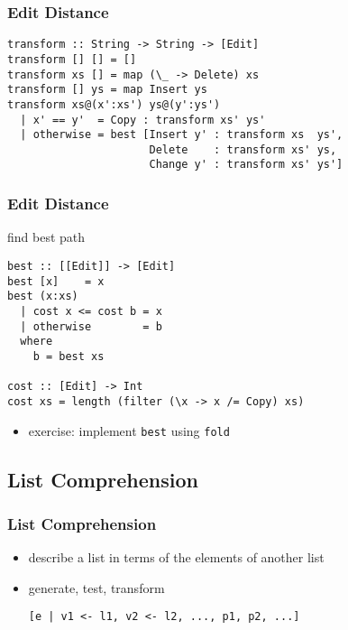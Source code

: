 \documentclass[dvipsnames]{beamer}
\theoremstyle{plain}
\begin{document}
\begin{frame}[fragile]
  \frametitle{Edit Distance}

  \begin{exampleblock}{}
    \begin{lstlisting}
transform :: String -> String -> [Edit]
transform [] [] = []
transform xs [] = map (\_ -> Delete) xs
transform [] ys = map Insert ys
transform xs@(x':xs') ys@(y':ys')
  | x' == y'  = Copy : transform xs' ys'
  | otherwise = best [Insert y' : transform xs  ys',
                      Delete    : transform xs' ys,
                      Change y' : transform xs' ys']
    \end{lstlisting}
  \end{exampleblock}
\end{frame}

\begin{frame}[fragile]
  \frametitle{Edit Distance}

  \begin{exampleblock}{find best path}
    \begin{lstlisting}
best :: [[Edit]] -> [Edit]
best [x]    = x
best (x:xs)
  | cost x <= cost b = x
  | otherwise        = b
  where
    b = best xs

cost :: [Edit] -> Int
cost xs = length (filter (\x -> x /= Copy) xs)
    \end{lstlisting}
  \end{exampleblock}

  \pause
  \begin{itemize}
    \item exercise: implement \lstinline|best| using \lstinline|fold|
  \end{itemize}
\end{frame}

\subsection{List Comprehension}

\begin{frame}[fragile]
  \frametitle{List Comprehension}

  \begin{itemize}
    \item describe a list in terms of the elements of another list
    \item generate, test, transform
    \begin{lstlisting}[style=syntax]
[e | v1 <- l1, v2 <- l2, ..., p1, p2, ...]
    \end{lstlisting}
  \end{itemize}
\end{frame}
\end{document}
